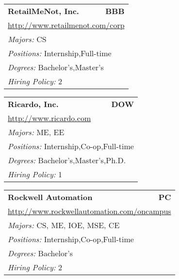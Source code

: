 \documentclass[twoside]{article}
\begin{document}
\begin{center}
\begin{multicols}{3}
\begin{FlushLeft}
\begin{minipage}{.9\columnwidth}
\end{minipage}
 
\begin{minipage}{.9\columnwidth}\begin{tabularx}{.95\columnwidth}{Xr}
                 {\Large\bf RetailMeNot, Inc.} & {\Large\bf BBB}\\
    \multicolumn{2}{p{.95\columnwidth}}{\url{http://www.retailmenot.com/corp}}\\
    \multicolumn{2}{p{.95\columnwidth}}{\emph{Majors:} CS}\\
    \multicolumn{2}{p{.95\columnwidth}}{\emph{Positions:} Internship,Full-time}\\
    \multicolumn{2}{p{.95\columnwidth}}{\emph{Degrees:} Bachelor's,Master's}\\
    \multicolumn{2}{p{.95\columnwidth}}{\emph{Hiring Policy:} 2}\\
    \end{tabularx}
    
\end{minipage}
 
\begin{minipage}{.9\columnwidth}\begin{tabularx}{.95\columnwidth}{Xr}
                 {\Large\bf Ricardo, Inc.} & {\Large\bf DOW}\\
    \multicolumn{2}{p{.95\columnwidth}}{\url{http://www.ricardo.com}}\\
    \multicolumn{2}{p{.95\columnwidth}}{\emph{Majors:} ME, EE}\\
    \multicolumn{2}{p{.95\columnwidth}}{\emph{Positions:} Internship,Co-op,Full-time}\\
    \multicolumn{2}{p{.95\columnwidth}}{\emph{Degrees:} Bachelor's,Master's,Ph.D.}\\
    \multicolumn{2}{p{.95\columnwidth}}{\emph{Hiring Policy:} 1}\\
    \end{tabularx}
    
\end{minipage}
 
\begin{minipage}{.9\columnwidth}\begin{tabularx}{.95\columnwidth}{Xr}
                 {\Large\bf Rockwell Automation} & {\Large\bf PC}\\
    \multicolumn{2}{p{.95\columnwidth}}{\url{http://www.rockwellautomation.com/oncampus}}\\
    \multicolumn{2}{p{.95\columnwidth}}{\emph{Majors:} CS, ME, IOE, MSE, CE}\\
    \multicolumn{2}{p{.95\columnwidth}}{\emph{Positions:} Internship,Co-op,Full-time}\\
    \multicolumn{2}{p{.95\columnwidth}}{\emph{Degrees:} Bachelor's}\\
    \multicolumn{2}{p{.95\columnwidth}}{\emph{Hiring Policy:} 2}\\
    \end{tabularx}
    

\end{minipage}
\end{FlushLeft}
\end{multicols}
\end{center}
\end{document}
